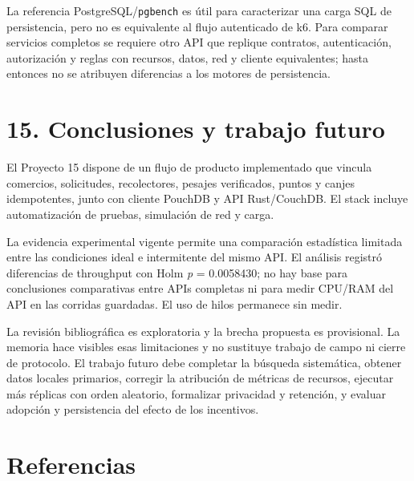 \documentclass[
  spanish,
  12pt,
  a4paper,
]{article}
\begin{document}
La referencia PostgreSQL/\texttt{pgbench} es útil para caracterizar una
carga SQL de persistencia, pero no es equivalente al flujo autenticado
de k6. Para comparar servicios completos se requiere otro API que
replique contratos, autenticación, autorización y reglas con recursos,
datos, red y cliente equivalentes; hasta entonces no se atribuyen
diferencias a los motores de persistencia.

\section{15. Conclusiones y trabajo
futuro}\label{conclusiones-y-trabajo-futuro}

El Proyecto 15 dispone de un flujo de producto implementado que vincula
comercios, solicitudes, recolectores, pesajes verificados, puntos y
canjes idempotentes, junto con cliente PouchDB y API Rust/CouchDB. El
stack incluye automatización de pruebas, simulación de red y carga.

La evidencia experimental vigente permite una comparación estadística
limitada entre las condiciones ideal e intermitente del mismo API. El
análisis registró diferencias de throughput con Holm \emph{p} =
0.0058430; no hay base para conclusiones comparativas entre APIs
completas ni para medir CPU/RAM del API en las corridas guardadas. El
uso de hilos permanece sin medir.

La revisión bibliográfica es exploratoria y la brecha propuesta es
provisional. La memoria hace visibles esas limitaciones y no sustituye
trabajo de campo ni cierre de protocolo. El trabajo futuro debe
completar la búsqueda sistemática, obtener datos locales primarios,
corregir la atribución de métricas de recursos, ejecutar más réplicas
con orden aleatorio, formalizar privacidad y retención, y evaluar
adopción y persistencia del efecto de los incentivos.

\section{Referencias}\label{referencias}
\end{document}
